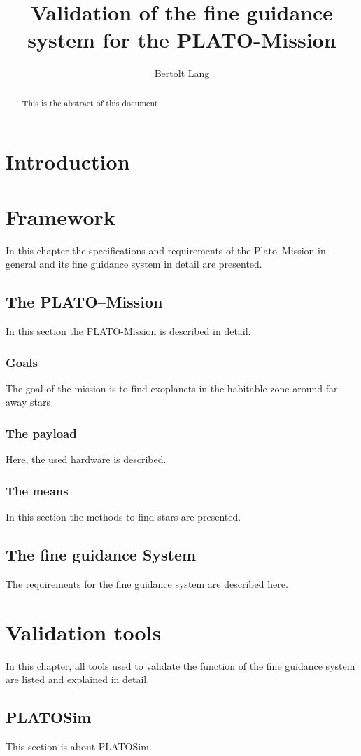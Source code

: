 \documentclass[11pt,a4paper]{report}
\author{Bertolt Lang}
\title{Validation of the fine guidance system for the PLATO-Mission}
\begin{document}
\maketitle
\begin{abstract}
This is the abstract of this document
\end{abstract}
\tableofcontents
\chapter{Introduction}

\chapter{Framework}
In this chapter the specifications and requirements of the Plato--Mission in general and its fine guidance system in detail are presented.
	\section{The PLATO--Mission}
	In this section the PLATO-Mission is described in 				detail.
		\subsection{Goals}
		The goal of the mission is to find exoplanets in the 				habitable zone around far away stars
		\subsection{The payload}
		Here, the used hardware is described.
		\subsection{The means}
		In this section the methods to find stars are 						presented. 
	\section{The fine guidance System}
	The requirements for the fine guidance system are 					described here.
\chapter{Validation tools}
In this chapter, all tools used to validate the function of the fine guidance system are listed and explained in detail.  
	\section{PLATOSim}
	This section is about PLATOSim.
\end{document}
